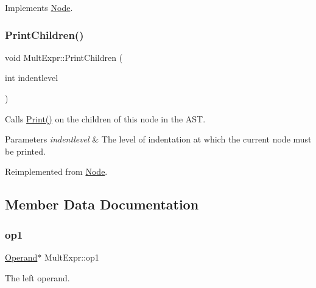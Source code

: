 Implements \hyperlink{class_node_a56e29657306ffb004d69c6929ae44269}{Node}.

\mbox{\label{class_mult_expr_ae87b8f5f11f98d66a6327a110267348d}} 
\subsubsection{\texorpdfstring{Print\+Children()}{PrintChildren()}}
{\footnotesize\ttfamily void Mult\+Expr\+::\+Print\+Children (\begin{DoxyParamCaption}\item[{int}]{indentlevel }\end{DoxyParamCaption})\hspace{0.3cm}{\ttfamily [virtual]}}

Calls \hyperlink{class_node_a9ef727fd72d1a37792b3db60a8a479dd}{Print()} on the children of this node in the A\+ST. 
\begin{DoxyParams}{Parameters}
{\em indentlevel} & The level of indentation at which the current node must be printed. \\
\hline
\end{DoxyParams}


Reimplemented from \hyperlink{class_node_a3e67ec8d22182b721717af14fe0c3000}{Node}.



\subsection{Member Data Documentation}
\mbox{\label{class_mult_expr_aa5ca086a99b10f512002938ec619b0e3}} 
\subsubsection{\texorpdfstring{op1}{op1}}
{\footnotesize\ttfamily \hyperlink{class_operand}{Operand}$\ast$ Mult\+Expr\+::op1\hspace{0.3cm}{\ttfamily [protected]}}

The left operand. \mbox{\label{class_mult_expr_a92004aab48eaa8d46b2bbe4caa250c80}} 
